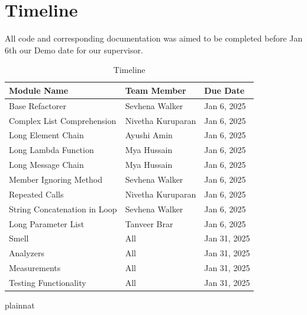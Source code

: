 \documentclass[12pt, titlepage]{article}
\begin{document}

\section{Timeline}

All code and corresponding documentation was aimed to be completed before Jan 6th our Demo date for our supervisor.

\begin{table}[h!]
  \centering
  \caption{Timeline}
  \begin{tabular}{|l|l|l|}
  \hline
  \textbf{Module Name} & \textbf{Team Member}        & \textbf{Due Date} \\ \hline
  Base Refactorer                     & Sevhena Walker              & Jan 6, 2025    \\ \hline
  Complex List Comprehension          & Nivetha Kuruparan              & Jan 6, 2025    \\ \hline
  Long Element Chain                  & Ayushi Amin              & Jan 6, 2025     \\ \hline
  Long Lambda Function                & Mya Hussain              & Jan 6, 2025     \\ \hline
  Long Message Chain                  & Mya Hussain              & Jan 6, 2025     \\ \hline
  Member Ignoring Method              & Sevhena Walker             & Jan 6, 2025     \\ \hline
  Repeated Calls                      & Nivetha Kuruparan               & Jan 6, 2025     \\ \hline
  String Concatenation in Loop        & Sevhena Walker              & Jan 6, 2025     \\ \hline
  Long Parameter List                 & Tanveer Brar              & Jan 6, 2025     \\ \hline
  Smell                               & All             & Jan 31, 2025    \\ \hline
  Analyzers                           & All            & Jan 31, 2025      \\ \hline
  Measurements                        & All          & Jan 31, 2025      \\ \hline
  Testing Functionality               & All           & Jan 31, 2025      \\ \hline
  \end{tabular}
  \end{table}
  

 {plainnat}


\newpage{}
\end{document}
